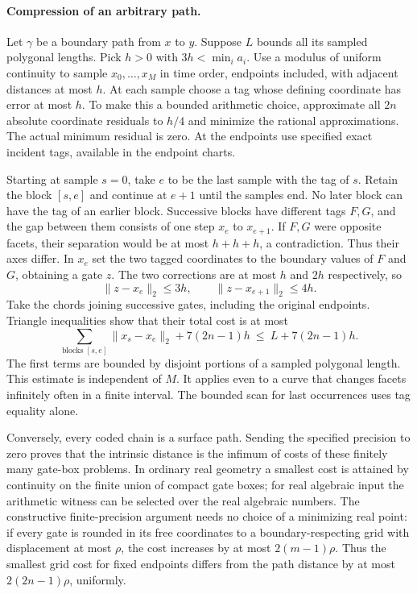\documentclass[10pt,letterpaper]{article}
\begin{document}
\paragraph{Compression of an arbitrary path.}
Let $\gamma$ be a boundary path from $x$ to $y$. Suppose $L$ bounds
all its sampled polygonal lengths. Pick $h>0$ with $3h<\min_i a_i$.
Use a modulus of uniform continuity to sample $x_0,\ldots,x_M$ in
time order, endpoints included, with adjacent distances at most $h$.
At each sample choose a tag whose defining coordinate has error at
most $h$. To make this a bounded arithmetic choice, approximate all
$2n$ absolute coordinate residuals to $h/4$ and minimize the rational
approximations. The actual minimum residual is zero. At the endpoints
use specified exact incident tags, available in the endpoint charts.

Starting at sample $s=0$, take $e$ to be the last sample with the
tag of $s$. Retain the block $[s,e]$ and continue at $e+1$ until the
samples end. No later block can have the tag of an earlier block.
Successive blocks have different tags $F,G$, and the gap between
them consists of one step $x_e$ to $x_{e+1}$. If $F,G$ were opposite
facets, their separation would be at most $h+h+h$, a contradiction.
Thus their axes differ. In $x_e$ set the two tagged coordinates
to the boundary values of $F$ and $G$, obtaining a gate $z$.
The two corrections are at most $h$ and $2h$ respectively, so
\[
             \|z-x_e\|_2\le 3h,\qquad
             \|z-x_{e+1}\|_2\le 4h .
\]
Take the chords joining successive gates, including the original
endpoints. Triangle inequalities show that their total cost is at most
\[
   \sum_{\text{blocks }[s,e]}\|x_s-x_e\|_2+7(2n-1)h
                     \ \le\ L+7(2n-1)h.
\]
The first terms are bounded by disjoint portions of a sampled
polygonal length. This estimate is independent of $M$. It applies even
to a curve that changes facets infinitely often in a finite interval.
The bounded scan for last occurrences uses tag equality alone.

Conversely, every coded chain is a surface path. Sending the specified
precision to zero proves that the intrinsic distance is the infimum
of costs of these finitely many gate-box problems. In ordinary real
geometry a smallest cost is attained by continuity on the finite union
of compact gate boxes; for real algebraic input the arithmetic witness
can be selected over the real algebraic numbers. The constructive
finite-precision argument needs no choice of a minimizing real point:
if every gate is rounded in its free coordinates to a boundary-respecting
grid with displacement at most $\rho$, the cost increases by at most
$2(m-1)\rho$. Thus the smallest grid cost for fixed endpoints differs
from the path distance by at most $2(2n-1)\rho$, uniformly.
\end{document}

